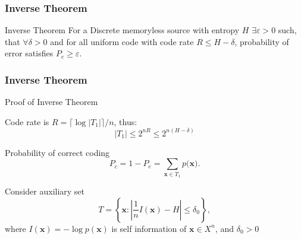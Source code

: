 \documentclass[14pt]{beamer}
\renewcommand{\vec}[1]{\ensuremath{\boldsymbol{#1}}}
\begin{document}

\begin{frame}
\frametitle{Inverse Theorem}
\begin{itemize}
    \begin{theorem}{Inverse Theorem} For a Discrete memoryless source with entropy $H$ $\exists \varepsilon > 0$ such, that $\forall \delta > 0$ and for all uniform code with code rate $R \le H - \delta $, probability of error satisfies $P_e \ge \varepsilon $.
    \end{theorem}

\end{itemize}
\end{frame}


\begin{frame}
\frametitle{Inverse Theorem}
Proof of Inverse Theorem
\begin{itemize}
\small{ 

    \item Code rate is $R = \lceil \log \vert T_1 \vert \rceil /n$, thus:
    \begin{equation}
    \label{eq29} \vert T_1 \vert \leq  2^{nR} \le 2^{n(H - \delta )}
    \end{equation}

    \item Probability of correct coding
    \begin{equation}
    \label{eq30} P_c = 1 - P_e = \sum\limits_{\vec x \in T_1 } {p(\vec x} ).
    \end{equation}

    \item Consider auxiliary set
    \begin{equation}
    \label{eq31} T = \left\{ {\vec x:\left| {\frac{1}{n}I(\vec x) - H}
    \right| \le \delta _0 } \right\},
    \end{equation}
    where $I(\vec x) = - \log p(\vec x)$ is self information of $\vec x \in X^n$, and $\delta _0 > 0$
}
\end{itemize}
\end{frame}
\end{document}
